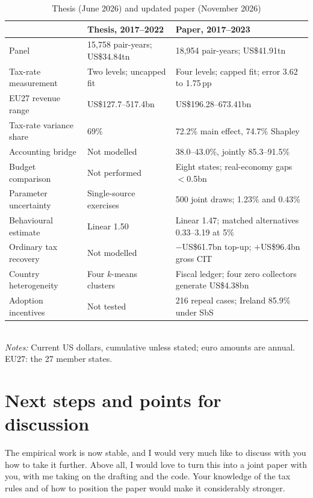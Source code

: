 \documentclass[11pt,a4paper]{article}
\newcommand{\EUR}{\texteuro}
\newcommand{\usd}{US\$}
\newcommand{\pp}{\,pp}
\begin{document}
\begin{table}[!htbp]
\centering
\footnotesize
\caption{Thesis (June 2026) and updated paper (November 2026)}
\label{tab:comparison}
\renewcommand{\arraystretch}{1.12}
\begin{tabularx}{\textwidth}{@{}P{3.3cm}P{4.9cm}L@{}}
\toprule
 & Thesis, 2017–2022 & Paper, 2017–2023 \\
\midrule
Panel & 15,758 pair-years; \usd34.84tn & 18,954 pair-years; \usd41.91tn \\
Tax-rate measurement & Two levels; uncapped fit & Four levels; capped fit; error 3.62 to 1.75\pp \\
EU27 revenue range & \usd127.7–517.4bn & \usd196.28–673.41bn \\
Tax-rate variance share & 69\% & 72.2\% main effect, 74.7\% Shapley \\
Accounting bridge & Not modelled & 38.0–43.0\%, jointly 85.3–91.5\% \\
Budget comparison & Not performed & Eight states; real-economy gaps $<$\EUR0.5bn \\
Parameter uncertainty & Single-source exercises & 500 joint draws; 1.23\% and 0.43\% \\
Behavioural estimate & Linear 1.50 & Linear 1.47; matched alternatives 0.33–3.19 at 5\% \\
Ordinary tax recovery & Not modelled & $-$\usd61.7bn top-up; $+$\usd96.4bn gross CIT \\
Country heterogeneity & Four $k$-means clusters & Fiscal ledger; four zero collectors generate \usd4.38bn \\
Adoption incentives & Not tested & 216 repeal cases; Ireland 85.9\% under SbS \\
\bottomrule
\end{tabularx}\\[0.2em]
{\footnotesize\textit{Notes:} Current US dollars, cumulative unless stated; euro amounts are annual. EU27: the 27 member states.}
\end{table}

\section{Next steps and points for discussion}

The empirical work is now stable, and I would very much like to discuss with you how to take it further. Above all, I would love to turn this into a joint paper with you, with me taking on the drafting and the code. Your knowledge of the tax rules and of how to position the paper would make it considerably stronger.
\end{document}
